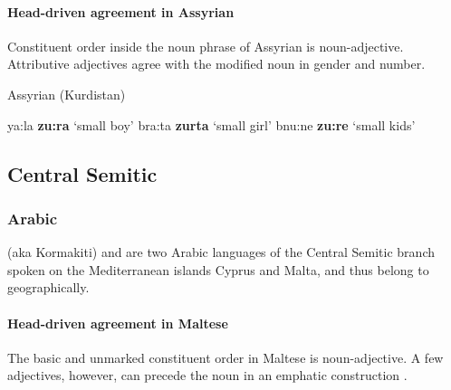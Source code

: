 \paragraph*{Head\hyp{}driven agreement in Assyrian}
Constituent order inside the noun phrase of Assyrian is noun-adjective. Attributive adjectives agree with the modified noun in gender and number.
\begin{exe}
\ex \rm{Assyrian (Kurdistan) \citep{krotkoff1982}}
\begin{xlist}
\ex	ya:la \textbf{zu:ra}	\rm{‘small boy’}
\ex	bra:ta \textbf{zurta}	\rm{‘small girl’}
\ex	bnu:ne \textbf{zu:re}	\rm{‘small kids’}
\end{xlist}
\end{exe}

\subsection{Central Semitic}		
\subsubsection{Arabic}
 (aka Kormakiti) and  are two Arabic languages of the Central Semitic branch spoken on the Mediterranean islands Cyprus and Malta, and thus belong to  geographically.

\paragraph*{Head\hyp{}driven agreement in Maltese}
The basic and unmarked constituent order in Maltese is noun-adjective. A few adjectives, however, can precede the noun in an emphatic construction \citep[71]{borg-etal1996}.

